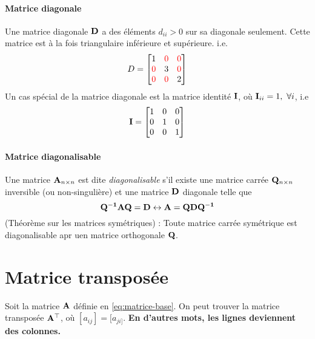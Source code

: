 \paragraph{Matrice diagonale} Une matrice diagonale $\mathbf{D}$ a des éléments $d_{ii} > 0$ sur sa diagonale seulement. Cette matrice est à la fois triangulaire inférieure et supérieure. i.e.
\begin{align*}
D = 
\begin{bmatrix}
1     & \textcolor{red}{0}    &  \textcolor{red}{0}   \\
\textcolor{red}{0}     & 3   & \textcolor{red}{0} \\
\textcolor{red}{0}   & \textcolor{red}{0}   & 2 \\
\end{bmatrix}
\end{align*}
Un cas spécial de la matrice diagonale est la matrice identité $\mathbf{I}$, où $\mathbf{I}_{ii} = 1 ,\ \forall i$, i.e
\begin{equation}
\label{eq:matrice-identite}
\mathbf{I} = 
\begin{bmatrix}
1     & 0    &  0   \\
0     & 1   & 0 \\
0   & 0   & 1 \\
\end{bmatrix}
\end{equation}


\paragraph{Matrice diagonalisable} Une matrice $\mathbf{A}_{n\times n}$ est dite \textit{diagonalisable} s'il existe une matrice carrée $\mathbf{Q}_{n \times n}$ inversible (ou non-singulière) et une matrice $\mathbf{D}$ diagonale telle que
\begin{equation}
\label{eq:matrice-diagonalisable}
\mathbf{Q^{-1} A Q = D} \leftrightarrow \mathbf{A = Q D Q^{-1}}
\end{equation}
(Théorème sur les matrices symétriques) : Toute matrice carrée symétrique est diagonalisable apr uen matrice orthogonale $\mathbf{Q}$.

\section{Matrice transposée} Soit la matrice $\mathbf{A}$ définie en \eqref{eq:matrice-base}. On peut trouver la matrice transposée $\mathbf{A^{\top}}$, où $[a_{ij}] = [a_{ji]}$. \textbf{En d'autres mots, les lignes deviennent des colonnes.}

